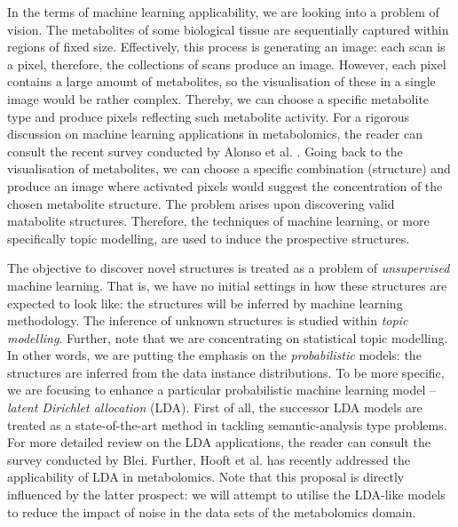 \documentclass{mprop}
\begin{document}
\par In the terms of machine learning applicability, we are looking into a problem of vision. The metabolites of some biological tissue are sequentially captured within regions of fixed size. Effectively, this process is generating an image: each scan is a pixel, therefore, the collections of scans produce an image. However, each pixel contains a large amount of metabolites, so the visualisation of these in a single image would be rather complex. Thereby, we can choose a specific metabolite type and produce pixels reflecting such metabolite activity. For a rigorous discussion on machine learning applications in metabolomics, the reader can consult the recent survey conducted by Alonso et al. \cite{Alonso-et-al}. Going back to the visualisation of metabolites, we can choose a specific combination (structure) and produce an image where activated pixels would suggest the concentration of the chosen metabolite structure. The problem arises upon discovering valid matabolite structures. Therefore, the techniques of machine learning, or more specifically topic modelling, are used to induce the prospective structures.

\par The objective to discover novel structures is treated as a problem of \textit{unsupervised} machine learning. That is, we have no initial settings in how these structures are expected to look like: the structures will be inferred by machine learning methodology. The inference of unknown structures is studied within \textit{topic modelling}. Further, note that we are concentrating on statistical topic modelling. In other words, we are putting the emphasis on the \textit{probabilistic} models: the structures are inferred from the data instance distributions. To be more specific, we are focusing to enhance a particular probabilistic machine learning model -- \textit{latent Dirichlet allocation} (LDA). First of all, the successor LDA models are treated as a state-of-the-art method in tackling semantic-analysis type problems. For more detailed review on the LDA applications, the reader can consult the survey \cite{blei_2012} conducted by Blei. Further, Hooft et al. \cite{hooft} has recently addressed the applicability of LDA in metabolomics. Note that this proposal is directly influenced by the latter prospect: we will attempt to utilise the LDA-like models to reduce the impact of noise in the data sets of the metabolomics domain.  
\end{document}

